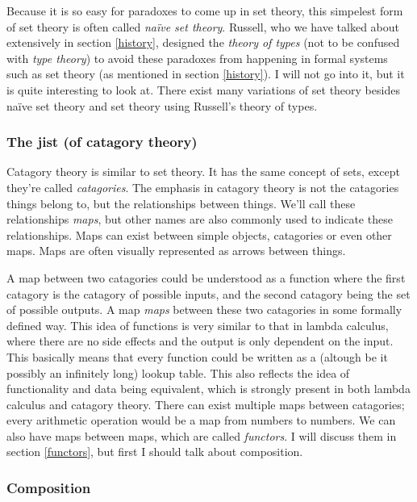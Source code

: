 \documentclass[11pt]{article}
\begin{document}
Because it is so easy for paradoxes to come up in set theory, this simpelest
form of set theory is often called \emph{naïve set theory}. Russell, who we
have talked about extensively in section \ref{history}, designed the
\emph{theory of types} (not to be confused with \emph{type theory}) to avoid
these paradoxes from happening in formal systems such as set theory (as
mentioned in section \ref{history}). I will not go into it, but it is quite
interesting to look at.  There exist many variations of set theory besides
naïve set theory and set theory using Russell's theory of types.


\subsubsection{The jist (of catagory theory)}

Catagory theory is similar to set theory. It has the same concept of sets,
except they're called \emph{catagories}. The emphasis in catagory theory is not
the catagories things belong to, but the relationships between things.  We'll
call these relationships \emph{maps}, but other names are also commonly used to
indicate these relationships. Maps can exist between simple objects, catagories
or even other maps. Maps are often visually represented as arrows between
things.

A map between two catagories could be understood as a function where the first
catagory is the catagory of possible inputs, and the second catagory being the
set of possible outputs. A map \emph{maps} between these two catagories in some
formally defined way. This idea of functions is very similar to that in lambda
calculus, where there are no side effects and the output is only dependent on
the input. This basically means that every function could be written as a
(altough be it possibly an infinitely long) lookup table. This also reflects
the idea of functionality and data being equivalent, which is strongly present
in both lambda calculus and catagory theory. There can exist multiple maps
between catagories; every arithmetic operation would be a map from numbers to
numbers. We can also have maps between maps, which are called \emph{functors}.
I will discuss them in section \ref{functors}, but first I should talk about
composition.

\subsubsection{Composition}
\end{document}
